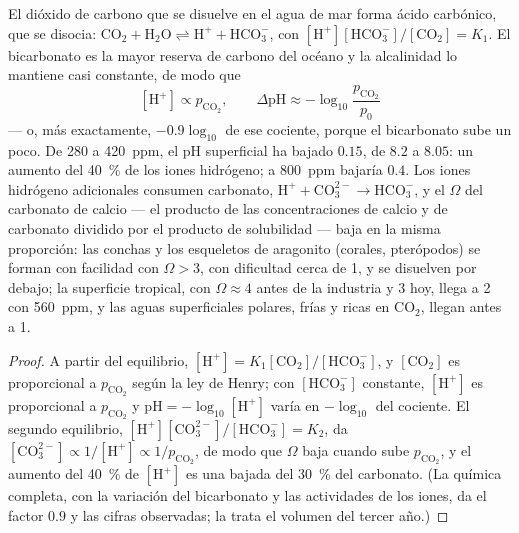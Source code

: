 \begin{theorem}[La acidificación]\label{thm:b2:global-change:acid}
El dióxido de carbono que se disuelve en el agua de mar forma ácido
carbónico, que se disocia: $\ensuremath{\mathrm{CO_2}} + \ensuremath{\mathrm{H_2O}} \rightleftharpoons \ensuremath{\mathrm{H^{+}}} +
\ensuremath{\mathrm{HCO_3^{-}}}$, con $[\ensuremath{\mathrm{H^{+}}}][\ensuremath{\mathrm{HCO_3^{-}}}]/[\ensuremath{\mathrm{CO_2}}] = K_1$.
El bicarbonato es la mayor reserva de carbono del océano y la alcalinidad
lo mantiene casi constante, de modo que
\[
[\ensuremath{\mathrm{H^{+}}}] \propto p_{\ensuremath{\mathrm{CO_2}}}, \qquad
\Delta\mathrm{pH} \approx -\log_{10}\frac{p_{\ensuremath{\mathrm{CO_2}}}}{p_0}
\]
--- o, más exactamente, $-0.9\log_{10}$ de ese cociente, porque el bicarbonato
sube un poco. De 280 a \qty{420}{ppm}, el pH superficial ha bajado
$0.15$, de $8.2$ a $8.05$: un aumento del \qty{40}{\%} de los iones
hidrógeno; a \qty{800}{ppm} bajaría $0.4$. Los iones hidrógeno adicionales
consumen carbonato, $\ensuremath{\mathrm{H^{+}}} + \ensuremath{\mathrm{CO_3^{2-}}} \to \ensuremath{\mathrm{HCO_3^{-}}}$, y
el \emph{} $\Omega$ del carbonato de calcio ---
el producto de las concentraciones de calcio y de carbonato dividido por
el producto de solubilidad --- baja en la misma proporción: las conchas y
los esqueletos de aragonito (corales, pterópodos) se forman con facilidad
con $\Omega > 3$, con dificultad cerca de 1, y se disuelven por debajo; la
superficie tropical, con $\Omega \approx 4$ antes de la industria y 3
hoy, llega a 2 con \qty{560}{ppm}, y las aguas superficiales polares,
frías y ricas en \ensuremath{\mathrm{CO_2}}, llegan antes a 1.
\end{theorem}
\begin{proof}
A partir del equilibrio, $[\ensuremath{\mathrm{H^{+}}}] = K_1[\ensuremath{\mathrm{CO_2}}]/[\ensuremath{\mathrm{HCO_3^{-}}}]$, y
$[\ensuremath{\mathrm{CO_2}}]$ es proporcional a $p_{\ensuremath{\mathrm{CO_2}}}$ según la ley de Henry;
con $[\ensuremath{\mathrm{HCO_3^{-}}}]$ constante, $[\ensuremath{\mathrm{H^{+}}}]$ es proporcional a
$p_{\ensuremath{\mathrm{CO_2}}}$ y $\mathrm{pH} = -\log_{10}[\ensuremath{\mathrm{H^{+}}}]$ varía en
$-\log_{10}$ del cociente. El segundo equilibrio, $[\ensuremath{\mathrm{H^{+}}}][\ensuremath{\mathrm{CO_3^{2-}}}]/[\ensuremath{\mathrm{HCO_3^{-}}}]
= K_2$, da $[\ensuremath{\mathrm{CO_3^{2-}}}] \propto 1/[\ensuremath{\mathrm{H^{+}}}] \propto
1/p_{\ensuremath{\mathrm{CO_2}}}$, de modo que $\Omega$ baja cuando sube $p_{\ensuremath{\mathrm{CO_2}}}$, y
el aumento del \qty{40}{\%} de $[\ensuremath{\mathrm{H^{+}}}]$ es una bajada del \qty{30}{\%}
del carbonato. (La química completa, con la variación del bicarbonato y
las actividades de los iones, da el factor $0.9$ y las cifras
observadas; la trata el volumen del tercer año.)
\end{proof}
